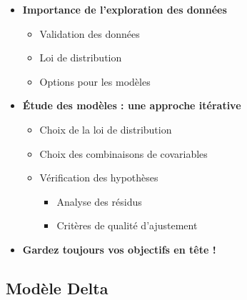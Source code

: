 \documentclass[french,a4paper]{article}
\providecommand{\tightlist}{%
  \setlength{\itemsep}{0pt}\setlength{\parskip}{0pt}}
\begin{document}
\begin{itemize}
\tightlist
\item
  \textbf{Importance de l'exploration des données}

  \begin{itemize}
  \tightlist
  \item
    Validation des données
  \item
    Loi de distribution
  \item
    Options pour les modèles
  \end{itemize}
\item
  \textbf{Étude des modèles : une approche itérative}

  \begin{itemize}
  \tightlist
  \item
    Choix de la loi de distribution
  \item
    Choix des combinaisons de covariables
  \item
    Vérification des hypothèses

    \begin{itemize}
    \tightlist
    \item
      Analyse des résidus
    \item
      Critères de qualité d'ajustement
    \end{itemize}
  \end{itemize}
\item
  \textbf{Gardez toujours vos objectifs en tête !}
\end{itemize}

\hypertarget{modele-delta-1}{%
\subsection{Modèle Delta}\label{modele-delta-1}}
\end{document}
